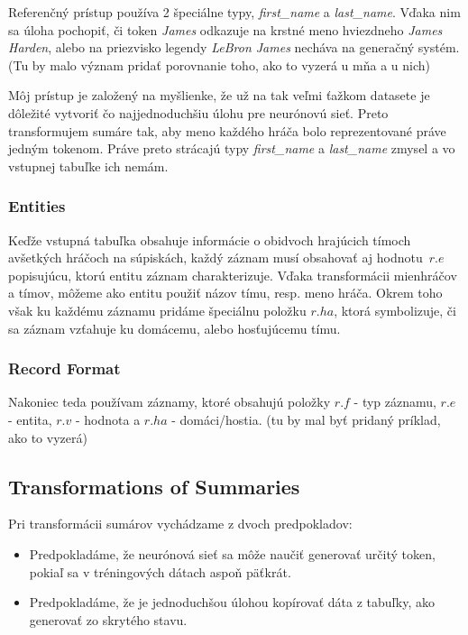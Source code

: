 Referenčný prístup používa 2 špeciálne typy, \emph{first\_name} a \emph{last\_name}. Vďaka nim sa úloha pochopiť, či token \emph{James} odkazuje na krstné meno hviezdneho \emph{James Harden}, alebo na priezvisko legendy \emph{LeBron James} necháva na generačný systém. (Tu by malo význam pridať porovnanie toho, ako to vyzerá u mňa a u nich)

Môj prístup je založený na myšlienke, že už na tak veľmi ťažkom datasete je dôležité vytvoriť čo najjednoduchšiu úlohu pre neurónovú sieť. Preto transformujem sumáre tak, aby meno každého hráča bolo reprezentované práve jedným tokenom. Práve preto strácajú typy \emph{first\_name} a \emph{last\_name} zmysel a vo vstupnej tabuľke ich nemám.

\subsubsection{Entities}

Keďže vstupná tabuľka obsahuje informácie o obidvoch hrajúcich tímoch a\linebreak[4]všetkých hráčoch na súpiskách, každý záznam musí obsahovať aj hodnotu~$r.e$ popisujúcu, ktorú entitu záznam charakterizuje. Vďaka transformácii mien\linebreak[4]hráčov a tímov, môžeme ako entitu použiť názov tímu, resp. meno hráča. Okrem toho však ku každému záznamu pridáme špeciálnu položku $r.ha$, ktorá symbolizuje, či sa záznam vzťahuje ku domácemu, alebo hosťujúcemu tímu. 

\subsubsection{Record Format}

Nakoniec teda používam záznamy, ktoré obsahujú položky $r.f$ - typ záznamu, $r.e$ - entita, $r.v$ - hodnota a $r.ha$ - domáci/hostia. (tu by mal byť pridaný príklad, ako to vyzerá)

\subsection{Transformations of Summaries}

Pri transformácii sumárov vychádzame z dvoch predpokladov:
\begin{itemize}
\item Predpokladáme, že neurónová sieť sa môže naučiť generovať určitý token, pokiaľ sa v tréningových dátach aspoň päťkrát.
\item Predpokladáme, že je jednoduchšou úlohou kopírovať dáta z tabuľky, ako generovať zo skrytého stavu.
\end{itemize}

